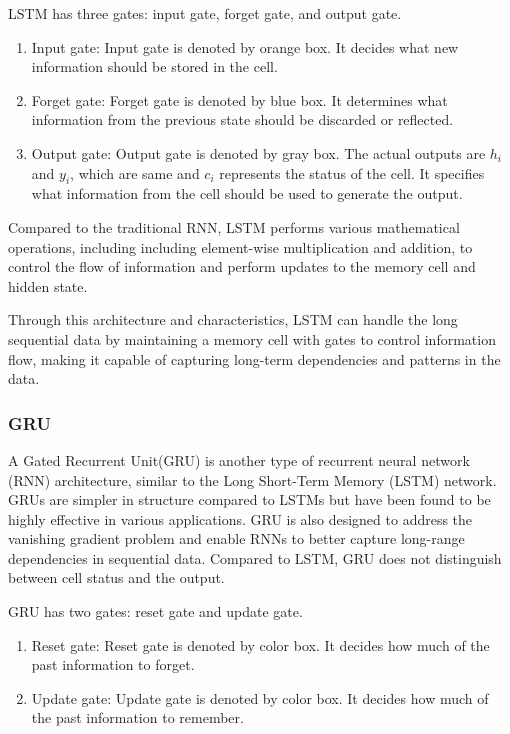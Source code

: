 LSTM has three gates: input gate, forget gate, and output gate.
\begin{enumerate}
	\item Input gate: 	Input gate is denoted by orange box. It decides what new information should be stored in the cell.
	\item Forget gate:	Forget gate is denoted by blue box. It determines what information from the previous state should be discarded or reflected.
	\item Output gate:	Output gate is denoted by gray box. The actual outputs are $h_{i}$ and $y_{i}$, which are same and $c_{i}$ represents the status of the cell. It specifies what information from the cell should be used to generate the output.
\end{enumerate}

Compared to the traditional RNN, LSTM performs various mathematical operations, including including element-wise multiplication and addition, to control the flow of information and perform updates to the memory cell and hidden state.

Through this architecture and characteristics, LSTM can handle the long sequential data by maintaining a memory cell with gates to control information flow, 
making it capable of capturing long-term dependencies and patterns in the data.

\subsubsection{GRU}

A Gated Recurrent Unit(GRU) is another type of recurrent neural network (RNN) architecture, 
similar to the Long Short-Term Memory (LSTM) network. 
GRUs are simpler in structure compared to LSTMs but have been found to be highly effective in various applications. 
GRU is also designed to address the vanishing gradient problem and enable RNNs to better capture long-range dependencies in sequential data. 
Compared to LSTM, GRU does not distinguish between cell status and the output.

GRU has two gates: reset gate and update gate.
\begin{enumerate}
	\item Reset gate: Reset gate is denoted by color box. It decides how much of the past information to forget.
	\item Update gate: Update gate is denoted by color box. It decides how much of the past information to remember.
\end{enumerate}

